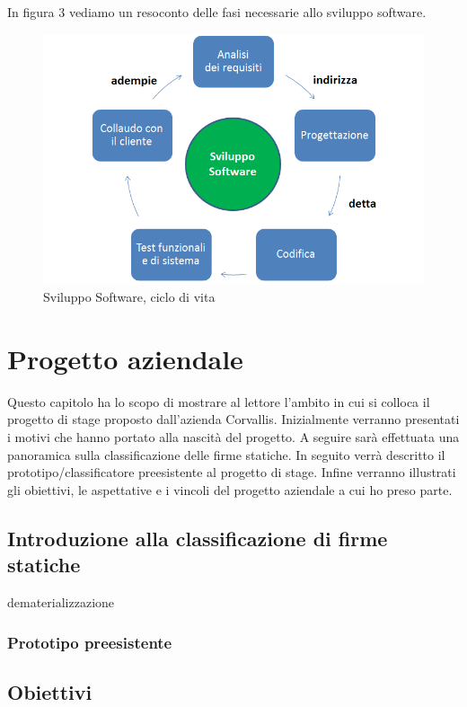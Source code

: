 In figura 3 vediamo un resoconto delle fasi necessarie allo sviluppo software.
\begin{figure}[h!]
\centering
\includegraphics[scale=0.55]{../Logo&Header/sviluppoSoftware.png}
\caption{ Sviluppo Software, ciclo di vita}
\end{figure}

\newpage
\newpage

\section{Progetto aziendale}
\label{2.0}
Questo capitolo ha lo scopo di mostrare al lettore l'ambito in cui si colloca il progetto di stage proposto dall'azienda Corvallis. Inizialmente verranno presentati i motivi che hanno portato alla nascità del progetto. A seguire sarà effettuata una panoramica sulla classificazione delle firme statiche. In seguito verrà descritto il prototipo/classificatore preesistente al progetto di stage. Infine verranno illustrati gli obiettivi, le aspettative e i vincoli del progetto aziendale a cui ho preso parte.
\subsection{Introduzione alla classificazione di firme statiche}
\label{2.1}
\gls{dematerializzazione}
\subsubsection{Prototipo preesistente}
\label{2.1.1}

\subsection{Obiettivi}
\label{2.2}

